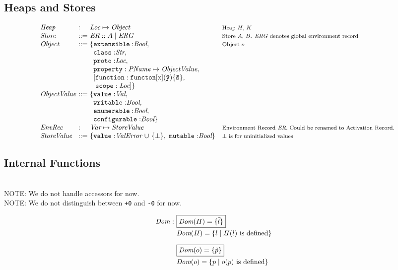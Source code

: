 \documentclass[a4paper, leqno]{amsart}
\newcommand{\cmt}[1]{\mbox{\footnotesize #1}}
\def\inred{\color{red}}
\def\inblue{\color{blue}}
\newcommand{\er}{\emph{ER}}
\newcommand{\erg}{\emph{ERG}}
\newcommand{\var}{\emph{Var}}
\newcommand{\sv}{\emph{StoreValue}}
\newcommand{\bool}{\emph{Bool}}
\newcommand{\ve}{\emph{ValError}}
\newcommand{\pname}{\emph{PName}}
\newcommand{\val}{\emph{Val}}
\newcommand{\loc}{\emph{Loc}}
\newcommand{\obj}{\emph{Object}}
\newcommand{\objv}{\emph{ObjectValue}}
\newcommand{\str}{\emph{Str}}
\newcommand{\dom}{\emph{Dom}}
\newcommand{\mkst}[2]{#1::#2}
\begin{document}
\newpage
{\inblue
\subsection{Heaps and Stores}
\[
\begin{array}{l@{}l@{}ll}
\emph{Heap} & \ : \ & \loc  \mapsto \obj& \cmt{Heap $H$, $K$}\\
\emph{Store} & \ ::= \ & \mkst{\er}A \mid \erg & \cmt{Store $A$, $B$. \erg\ denotes global environment record}\\
\obj & \ ::= \ & {\tt \{extensible:} \bool,& \cmt{Object $o$}\\
 & \  \ & \phantom{\{}{\tt class:} \str,& \\
 & \  \ & \phantom{\{}{\tt proto:} \loc,& \\
 & \  \ & \phantom{\{}{\tt property: \pname\mapsto\objv,}& \\
 & \  \ & \phantom{\{}[{\tt function:functon [x] ( \tilde{y} ) \{ \tilde{s} \} ,}& \\
 & \  \ & \phantom{\{[}{\tt scope: \loc}]\} & \\
\objv & \ ::= \ & \{{\tt value:} \val ,& \cmt{}\\
 & \  \ & \phantom{\{}{\tt writable:} \bool,& \\
 & \  \ & \phantom{\{}{\tt enumerable:} \bool,& \\
 & \  \ & \phantom{\{}{\tt configurable:} \bool\}& \\
\emph{EnvRec} & \ : \ & \var \mapsto \sv& \cmt{Environment Record \er.  Could be renamed to Activation Record.}\\
\sv & \ ::= \ & \{{\tt value:}\ve\
{\cup\ \{\bot\}},\
{\tt mutable:}\bool\}& \cmt{$\bot$ is for uninitialized values}\\
\end{array}
\]

\subsection{Internal Functions}

\hspace*{1em}
\\[1em]
{\inred NOTE: We do not handle accessors for now.}\\
{\inred NOTE: We do not distinguish between {\tt +0} and {\tt -0} for now.}

\[
\begin{array}{l@{}l@{}ll}

\dom & \ : \ & \fbox{$\dom(H) = \{\tilde{l}\}$} & \cmt{}\\[.5em]
 & \  \ & \dom(H) = \{ l \mid H(l)\ \mbox{is defined} \}  & \\[1em]
 & \ \ & \fbox{$\dom(o) = \{\tilde{p}\}$}& \\[.5em]
 & \  \ & \dom(o) = \{ p \mid o(p)\ \mbox{is defined} \} & \\[1em]


\end{array}\]}
\end{document}
